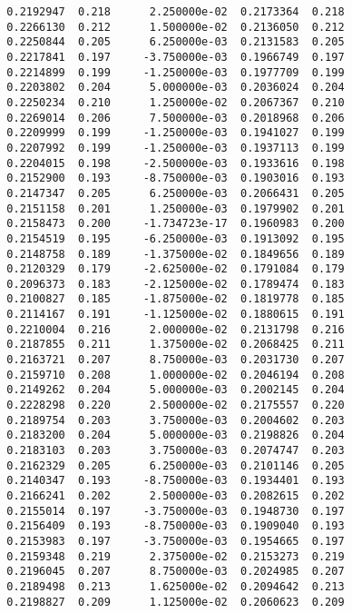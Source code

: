 \documentclass[
  letterpaper,
  DIV=11,
  numbers=noendperiod]{scrartcl}
\begin{document}
\begin{verbatim}
  0.2192947  0.218      2.250000e-02  0.2173364  0.218           
  0.2266130  0.212      1.500000e-02  0.2136050  0.212           
  0.2250844  0.205      6.250000e-03  0.2131583  0.205           
  0.2217841  0.197     -3.750000e-03  0.1966749  0.197           
  0.2214899  0.199     -1.250000e-03  0.1977709  0.199           
  0.2203802  0.204      5.000000e-03  0.2036024  0.204           
  0.2250234  0.210      1.250000e-02  0.2067367  0.210           
  0.2269014  0.206      7.500000e-03  0.2018968  0.206           
  0.2209999  0.199     -1.250000e-03  0.1941027  0.199           
  0.2207992  0.199     -1.250000e-03  0.1937113  0.199           
  0.2204015  0.198     -2.500000e-03  0.1933616  0.198           
  0.2152900  0.193     -8.750000e-03  0.1903016  0.193           
  0.2147347  0.205      6.250000e-03  0.2066431  0.205           
  0.2151158  0.201      1.250000e-03  0.1979902  0.201           
  0.2158473  0.200     -1.734723e-17  0.1960983  0.200           
  0.2154519  0.195     -6.250000e-03  0.1913092  0.195           
  0.2148758  0.189     -1.375000e-02  0.1849656  0.189           
  0.2120329  0.179     -2.625000e-02  0.1791084  0.179           
  0.2096373  0.183     -2.125000e-02  0.1789474  0.183           
  0.2100827  0.185     -1.875000e-02  0.1819778  0.185           
  0.2114167  0.191     -1.125000e-02  0.1880615  0.191           
  0.2210004  0.216      2.000000e-02  0.2131798  0.216           
  0.2187855  0.211      1.375000e-02  0.2068425  0.211           
  0.2163721  0.207      8.750000e-03  0.2031730  0.207           
  0.2159710  0.208      1.000000e-02  0.2046194  0.208           
  0.2149262  0.204      5.000000e-03  0.2002145  0.204           
  0.2228298  0.220      2.500000e-02  0.2175557  0.220           
  0.2189754  0.203      3.750000e-03  0.2004602  0.203           
  0.2183200  0.204      5.000000e-03  0.2198826  0.204           
  0.2183103  0.203      3.750000e-03  0.2074747  0.203           
  0.2162329  0.205      6.250000e-03  0.2101146  0.205           
  0.2140347  0.193     -8.750000e-03  0.1934401  0.193           
  0.2166241  0.202      2.500000e-03  0.2082615  0.202           
  0.2155014  0.197     -3.750000e-03  0.1948730  0.197           
  0.2156409  0.193     -8.750000e-03  0.1909040  0.193           
  0.2153983  0.197     -3.750000e-03  0.1954665  0.197           
  0.2159348  0.219      2.375000e-02  0.2153273  0.219           
  0.2196045  0.207      8.750000e-03  0.2024985  0.207           
  0.2189498  0.213      1.625000e-02  0.2094642  0.213           
  0.2198827  0.209      1.125000e-02  0.2060623  0.209           

\end{verbatim}
\end{document}
